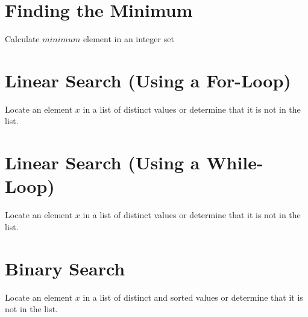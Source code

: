 \documentclass[journal]{IEEEtran}
\begin{document}
\section{Finding the Minimum}
 

\begin{algorithm}
  \caption{\color{green(html/cssgreen)}Calculate $minimum$ element in an integer set}
  \label{alg1}
  \color{green(html/cssgreen)}
  \begin{algorithmic}
    
  \end{algorithmic}
\end{algorithm}


\section{Linear Search (Using a For-Loop)}
 

\begin{algorithm}
  \caption{\color{green(html/cssgreen)}Locate an element $x$ in a list of distinct
values or determine that it is not in the list.}
  \label{alg1}
  \color{green(html/cssgreen)}
  \begin{algorithmic}
    
  \end{algorithmic}
\end{algorithm}
 
 
 
 \section{Linear Search (Using a While-Loop)}
 
 
\begin{algorithm}
  \caption{\color{green(html/cssgreen)}Locate an element $x$ in a list of distinct
values or determine that it is not in the list.}
  \label{alg1}
  \color{green(html/cssgreen)}
  \begin{algorithmic}
    
  \end{algorithmic}
\end{algorithm}


 \section{Binary Search}
 
 
\begin{algorithm}
  \caption{\color{green(html/cssgreen)}Locate an element $x$ in a list of distinct
and sorted values or determine that it is not in the list.}
  \label{alg1}
  \color{green(html/cssgreen)}
  \begin{algorithmic}
    
  \end{algorithmic}
\end{algorithm}
 
\end{document}
